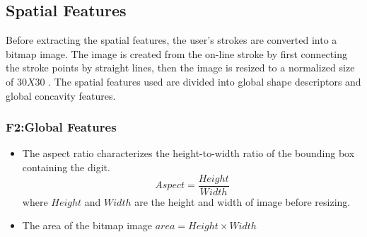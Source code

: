\documentclass[10pt]{IEEEtran}
\begin{document}
\subsection{Spatial Features}


Before extracting the spatial features, the user’s strokes are converted into a bitmap image. The image is created from the on-line stroke by first connecting the stroke points by straight lines, then the image is resized to a normalized size of $30X30$ . The spatial features used are divided into global shape descriptors  and global concavity features.
\subsubsection{F2:Global Features}

\begin{itemize}
\item The aspect ratio characterizes the height-to-width ratio of the bounding box containing the digit.
\[
    Aspect=\frac{Height}{Width}
\]
where $Height$ and $Width$ are the height and width of image before resizing.


\item The area of the bitmap image $area=Height\times Width$

\end{itemize}
\end{document}
